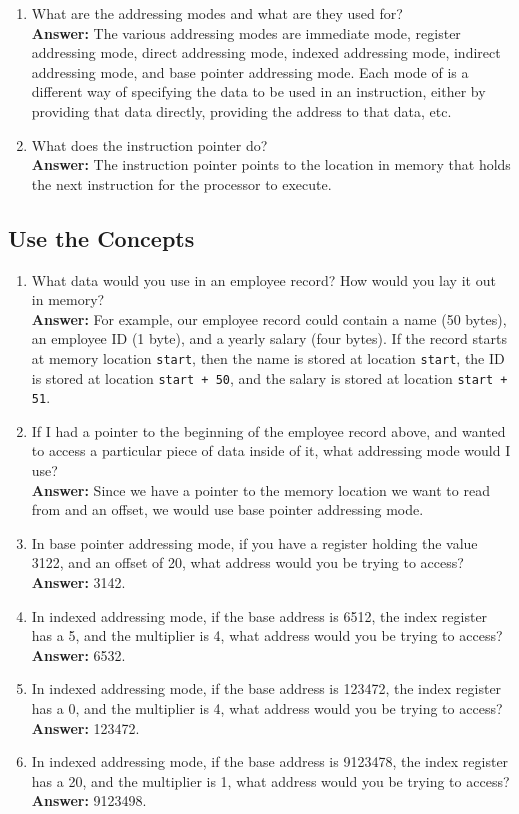 \documentclass[12pt]{article}
\begin{document}
\begin{enumerate}
    \item What are the addressing modes and what are they used for? \\
        \textbf{Answer:} The various addressing modes are immediate mode, register addressing mode, direct addressing mode, indexed addressing mode, indirect addressing mode, and base pointer addressing mode. Each mode of is a different way of specifying the data to be used in an instruction, either by providing that data directly, providing the address to that data, etc.
    \item What does the instruction pointer do? \\
        \textbf{Answer:} The instruction pointer points to the location in memory that holds the next instruction for the processor to execute.
\end{enumerate}

\subsection*{Use the Concepts}
\begin{enumerate}
    \item What data would you use in an employee record? How would you lay it out in memory? \\
	    \textbf{Answer:} For example, our employee record could contain a name (50 bytes), an employee ID (1 byte), and a yearly salary (four bytes). If the record starts at memory location \texttt{start}, then the name is stored at location \texttt{start}, the ID is stored at location \texttt{start + 50}, and the salary is stored at location \texttt{start + 51}.
    \item If I had a pointer to the beginning of the employee record above, and wanted to access a particular piece of data inside of it, what addressing mode would I use? \\
        \textbf{Answer:} Since we have a pointer to the memory location we want to read from and an offset, we would use base pointer addressing mode.
    \item In base pointer addressing mode, if you have a register holding the value 3122, and an offset of 20, what address would you be trying to access? \\
        \textbf{Answer:} 3142.
    \item In indexed addressing mode, if the base address is 6512, the index register has a 5, and the multiplier is 4, what address would you be trying to access? \\
        \textbf{Answer:} 6532.
    \item In indexed addressing mode, if the base address is 123472, the index register has a 0, and the multiplier is 4, what address would you be trying to access? \\
        \textbf{Answer:} 123472.
    \item In indexed addressing mode, if the base address is 9123478, the index register has a 20, and the multiplier is 1, what address would you be trying to access? \\
        \textbf{Answer:} 9123498.
\end{enumerate}
\end{document}
